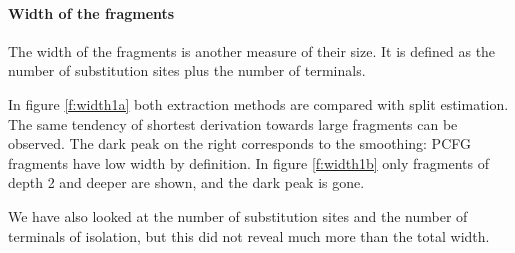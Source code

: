 \paragraph{Width of the fragments}

The width of the fragments is another measure of their size. It is defined as the number of substitution sites plus the number of terminals. 

In figure \ref{f:width1a} both extraction methods are compared with split estimation. The same tendency of shortest derivation towards large fragments can be observed. The dark peak on the right corresponds to the smoothing: PCFG fragments have low width by definition. In figure \ref{f:width1b} only fragments of depth 2 and deeper are shown, and the dark peak is gone.

We have also looked at the number of substitution sites and the number of terminals of isolation, but this did not reveal much more than the total width.


